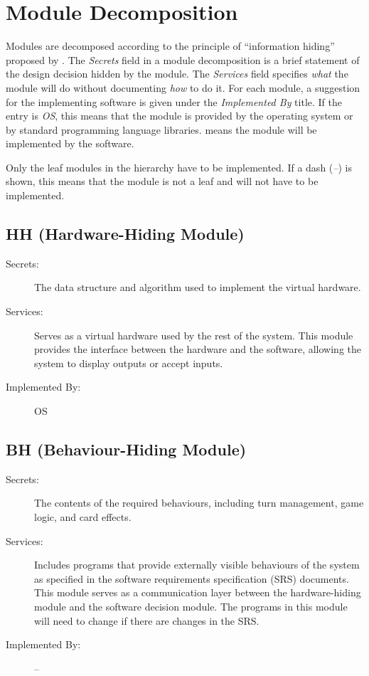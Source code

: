 \documentclass[12pt, titlepage]{article}
\begin{document}
\section{Module Decomposition} \label{SecMD}

Modules are decomposed according to the principle of ``information hiding''
proposed by \citet{ParnasEtAl1984}. The \emph{Secrets} field in a module
decomposition is a brief statement of the design decision hidden by the
module. The \emph{Services} field specifies \emph{what} the module will do
without documenting \emph{how} to do it. For each module, a suggestion for the
implementing software is given under the \emph{Implemented By} title. If the
entry is \emph{OS}, this means that the module is provided by the operating
system or by standard programming language libraries.  \emph{\progname{}} means the
module will be implemented by the \progname{} software.

Only the leaf modules in the hierarchy have to be implemented. If a dash
(\emph{--}) is shown, this means that the module is not a leaf and will not have
to be implemented.

\subsection{HH (Hardware-Hiding Module)}

\begin{description}
\item[Secrets:] The data structure and algorithm used to implement the virtual
  hardware.
\item[Services:] Serves as a virtual hardware used by the rest of the
  system. This module provides the interface between the hardware and the
  software, allowing the system to display outputs or accept inputs.
\item[Implemented By:] OS
\end{description}

\subsection{BH (Behaviour-Hiding Module)}

\begin{description}
\item[Secrets:] The contents of the required behaviours, including turn management, game logic, and card effects.
\item[Services:] Includes programs that provide externally visible behaviours of
  the system as specified in the software requirements specification (SRS)
  documents. This module serves as a communication layer between the
  hardware-hiding module and the software decision module. The programs in this
  module will need to change if there are changes in the SRS.
\item[Implemented By:] --
\end{description}
\end{document}
